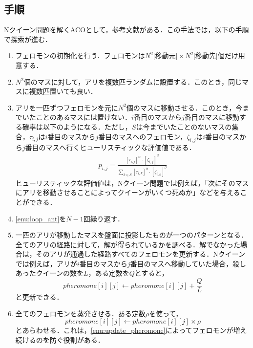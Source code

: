 \documentclass{jarticle}
\begin{document}
\subsection{手順}
Nクイーン問題を解くACOとして，参考文献\cite{ref:aco}がある．この手法では，以下の手順で探索が進む．
\begin{enumerate}
	\item フェロモンの初期化を行う．フェロモンは$N^2\text{[移動元]} \times N^2 \text{[移動先]} $個だけ用意する． 
	\item $N^2$個のマスに対して，アリを複数匹ランダムに設置する．このとき，同じマスに複数匹置いても良い．
	\item アリを一匹ずつフェロモンを元に$N^2$個のマスに移動させる．このとき，今までいたことのあるマスには置けない．$i$番目のマスから$j$番目のマスに移動する確率は以下のようになる．ただし，$S$は今までいたことのないマスの集合，$\tau_{i,j}$は$i$番目のマスから$j$番目のマスへのフェロモン，$\zeta_{i,j}$は$i$番目のマスから$j$番目のマスへ行くヒューリスティックな評価値である．
		\begin{eqnarray}
			p_{i,j} = \frac{[\tau_{i,j}]^\alpha \cdot [\zeta_{i,j}]^\beta}{\sum_{k \in S} [\tau_{i,k}]^\alpha \cdot [\zeta_{i,k}]^\beta}
		\end{eqnarray}
		ヒューリスティックな評価値は，Nクイーン問題では例えば，「次にそのマスにアリを移動させることによってクイーンがいくつ死ぬか」などを与えることができる．
	\label{enu:loop_ant}
	\item \ref{enu:loop_ant}を$N-1$回繰り返す．
	\item 一匹のアリが移動したマスを盤面に投影したものが一つのパターンとなる．全てのアリの経路に対して，解が得られているかを調べる．解でなかった場合は，そのアリが通過した経路すべてのフェロモンを更新する．Nクイーンでは例えば，アリが$i$番目のマスから$j$番目のマスへ移動していた場合，殺しあったクイーンの数を$L$，ある定数を$Q$とすると，
		\begin{equation}
			pheromone[i][j] \leftarrow pheromone[i][j] + \frac{Q}{L}
		\end{equation}
	と更新できる．
	\label{enu:update_pheromone}
	\item 全てのフェロモンを蒸発させる．ある定数$\rho$を使って，
		\begin{equation}
			pheromone[i][j] \leftarrow pheromone[i][j] \times \rho
		\end{equation}
		とあらわせる．これは，\ref{enu:update_pheromone}によってフェロモンが増え続けるのを防ぐ役割がある．
\end{enumerate}
\end{document}
